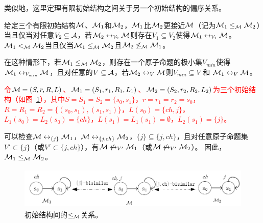 类似地，这里定理有限初始结构之间关于另一个初始结构的偏序关系。
\begin{definition}\label{def:closer}
	给定三个有限初始结构${\cal M}$、${\cal M}_1$和${\cal M}_2$，${\cal M}_1$比${\cal M}_2$更接近${\cal M}$（记为${\cal M}_1 \leq_{{\cal M}} {\cal M}_2$）当且仅当对任意$V_2 \subseteq \mathcal{A}$，若${\cal M}_2 \leftrightarrow_{V_2} {\cal M}$则存在$V_1 \subseteq V_2$使得${\cal M}_1 \leftrightarrow_{V_1} {\cal M}$。
	${\cal M}_1 <_{{\cal M}} {\cal M}_2$当且仅当${\cal M}_1 \leq_{{\cal M}} {\cal M}_2$且${\cal M}_2 \not \leq_{{\cal M}} {\cal M}_1$。
\end{definition}

在这种情形下，若${\cal M}_1 \leq_{{\cal M}} {\cal M}_2$，则存在一个原子命题的极小集$V_{min}$使得${\cal M}_1 \leftrightarrow_{V_{min}} {\cal M}$，且对任意的$V\subseteq {\cal A}$，若${\cal M}_2 \leftrightarrow_V {\cal M}$则$V_{min}\subseteq V$ 和 ${\cal M}_1 \leftrightarrow_V {\cal M}$。
\begin{example}
	\textcolor{red}{令${\cal M}= (S, r, R, L)$、${\cal M}_1 = (S_1, r_1, R_1, L_1)$、${\cal M}_2 = (S_2, r_2, R_2, L_2)$为三个初始结构（如图~\ref{fig:partialo}），其中$S = S_1 = S_2 = \{s_0, s_1\}$，$r=r_1=r_2= s_0$，$R=R_1=R_2=\{(s_0, s_1), (s_1, s_1)\}$，$L(s_0) = \{ch, j\}$，$L_1(s_0) = L_2(s_0) = \{ch\}$，$L(s_1) = L_1(s_1)=\emptyset$，$L_2(s_1) = \{j\}$。}
	
	可以检查${\cal M} \leftrightarrow_{\{j\}} {\cal M}_1$，${\cal M} \leftrightarrow_{\{j,ch\}} {\cal M}_2$，$\{j\}\subseteq \{j,ch\}$，且对任意原子命题集$V' \subset \{j\}$（或$V' \subset \{j,ch\}$），有${\cal M} \not\leftrightarrow_{V'} {\cal M}_1$（或${\cal M} \not \leftrightarrow_{V'} {\cal M}_2$）。
	因此，${\cal M}_1 \leq_{{\cal M}} {\cal M}_2$。
	\begin{figure}[h]%
		\centering
		\includegraphics[width=12cm,height=2cm]{figures/chapter06/partial_order.png}
		\caption{初始结构间的$\leq_{{\cal M}}$关系。}\label{fig:partialo}
		
	\end{figure}
\end{example}


